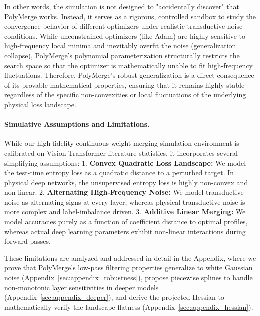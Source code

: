 In other words, the simulation is not designed to "accidentally discover" that PolyMerge works. Instead, it serves as a rigorous, controlled sandbox to study the convergence behavior of different optimizers under realistic transductive noise conditions. While unconstrained optimizers (like Adam) are highly sensitive to high-frequency local minima and inevitably overfit the noise (generalization collapse), PolyMerge's polynomial parameterization structurally restricts the search space so that the optimizer is mathematically unable to fit high-frequency fluctuations. Therefore, PolyMerge's robust generalization is a direct consequence of its provable mathematical properties, ensuring that it remains highly stable regardless of the specific non-convexities or local fluctuations of the underlying physical loss landscape.

\paragraph{Simulative Assumptions and Limitations.} While our high-fidelity continuous weight-merging simulation environment is calibrated on Vision Transformer literature statistics, it incorporates several simplifying assumptions:
1. \textbf{Convex Quadratic Loss Landscape:} We model the test-time entropy loss as a quadratic distance to a perturbed target. In physical deep networks, the unsupervised entropy loss is highly non-convex and non-linear.
2. \textbf{Alternating High-Frequency Noise:} We model transductive noise as alternating signs at every layer, whereas physical transductive noise is more complex and label-imbalance driven.
3. \textbf{Additive Linear Merging:} We model accuracies purely as a function of coefficient distance to optimal profiles, whereas actual deep learning parameters exhibit non-linear interactions during forward passes.

These limitations are analyzed and addressed in detail in the Appendix, where we prove that PolyMerge's low-pass filtering properties generalize to white Gaussian noise (Appendix~\ref{sec:appendix_robustness}), propose piecewise splines to handle non-monotonic layer sensitivities in deeper models (Appendix~\ref{sec:appendix_deeper}), and derive the projected Hessian to mathematically verify the landscape flatness (Appendix~\ref{sec:appendix_hessian}).

